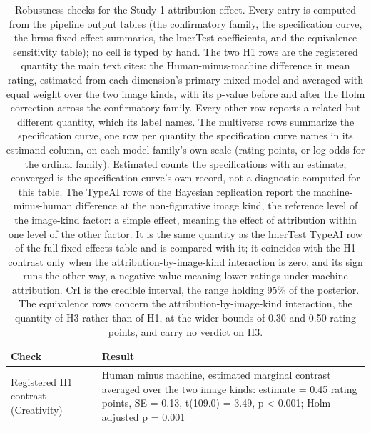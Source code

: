 \begin{table}[!h]
\centering
\captionsetup{font=small}
\caption{\label{tab:supp_table_1}Robustness checks for the Study 1 attribution effect. Every entry is computed from the pipeline output tables (the confirmatory family, the specification curve, the brms fixed-effect summaries, the lmerTest coefficients, and the equivalence sensitivity table); no cell is typed by hand. The two H1 rows are the registered quantity the main text cites: the Human-minus-machine difference in mean rating, estimated from each dimension's primary mixed model and averaged with equal weight over the two image kinds, with its p-value before and after the Holm correction across the confirmatory family. Every other row reports a related but different quantity, which its label names. The multiverse rows summarize the specification curve, one row per quantity the specification curve names in its estimand column, on each model family's own scale (rating points, or log-odds for the ordinal family). Estimated counts the specifications with an estimate; converged is the specification curve's own record, not a diagnostic computed for this table. The TypeAI rows of the Bayesian replication report the machine-minus-human difference at the non-figurative image kind, the reference level of the image-kind factor: a simple effect, meaning the effect of attribution within one level of the other factor. It is the same quantity as the lmerTest TypeAI row of the full fixed-effects table and is compared with it; it coincides with the H1 contrast only when the attribution-by-image-kind interaction is zero, and its sign runs the other way, a negative value meaning lower ratings under machine attribution. CrI is the credible interval, the range holding 95\% of the posterior. The equivalence rows concern the attribution-by-image-kind interaction, the quantity of H3 rather than of H1, at the wider bounds of 0.30 and 0.50 rating points, and carry no verdict on H3.}
\centering
\fontsize{8}{10}\selectfont
\begin{tabular}[t]{>{\raggedright\arraybackslash}p{4.2cm}>{\raggedright\arraybackslash}p{10.8cm}}
\toprule
Check & Result\\
\midrule
Registered H1 contrast (Creativity) & Human minus machine, estimated marginal contrast averaged over the two image kinds: estimate = 0.45 rating points, SE = 0.13, t(109.0) = 3.49, p < 0.001; Holm-adjusted p = 0.001\\

\end{tabular}
\end{table}
